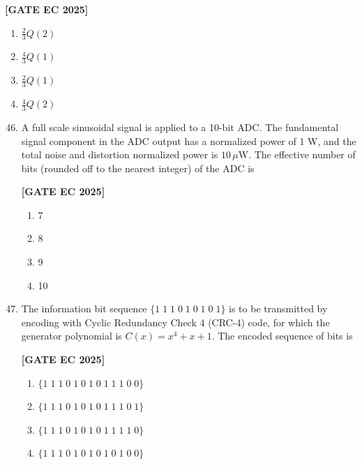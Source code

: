 \documentclass[12pt]{article}
\begin{document}
\begin{enumerate}[leftmargin=1.5em, label=\textbf{Q.\arabic*}., itemsep=2em]
\noindent \textbf{[GATE EC 2025]}
\begin{multicols}{2}
\begin{enumerate}
    \item $\tfrac{2}{3}Q(2)$
    \item $\tfrac{4}{3}Q(1)$
    \item $\tfrac{2}{3}Q(1)$
    \item $\tfrac{4}{3}Q(2)$
\end{enumerate}
\end{multicols}

\end{enumerate}

\begin{enumerate}[leftmargin=1.5em, label=\textbf{Q.\arabic*}., itemsep=2em]
\setcounter{enumi}{45}

\item A full scale sinusoidal signal is applied to a 10-bit ADC. The fundamental signal component in the ADC output has a normalized power of 1 W, and the total noise and distortion normalized power is $10\,\mu$W. The effective number of bits (rounded off to the nearest integer) of the ADC is

\noindent \textbf{[GATE EC 2025]}
\begin{multicols}{2}
\begin{enumerate}
    \item 7
    \item 8
    \item 9
    \item 10
\end{enumerate}
\end{multicols}

\item The information bit sequence $\{1\;1\;1\;0\;1\;0\;1\;0\;1\}$ is to be transmitted by encoding with Cyclic Redundancy Check 4 (CRC-4) code, for which the generator polynomial is $C(x) = x^4 + x + 1$. The encoded sequence of bits is

\noindent \textbf{[GATE EC 2025]}
\begin{multicols}{2}
\begin{enumerate}
    \item $\{1\;1\;1\;0\;1\;0\;1\;0\;1\;1\;1\;0\;0\}$
    \item $\{1\;1\;1\;0\;1\;0\;1\;0\;1\;1\;1\;0\;1\}$
    \item $\{1\;1\;1\;0\;1\;0\;1\;0\;1\;1\;1\;1\;0\}$
    \item $\{1\;1\;1\;0\;1\;0\;1\;0\;1\;0\;1\;0\;0\}$
\end{enumerate}
\end{multicols}


\end{enumerate}
\end{document}
